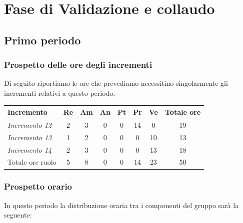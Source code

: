{{{{{{{{{{{{{{{{{\section{Fase di Validazione e collaudo}\label{PreventivoFaseDiProgettazionediValidazioneECollaudo}

\subsection{Primo periodo}\label{PreventivoFaseDiProgettazionediValidazioneECollaudoPrimoPeriodo}
\subsubsection{Prospetto delle ore degli incrementi}\label{PreventivoFaseDiProgettazionediValidazioneECollaudoPrimoPeriodoIncrementi}
Di seguito riportiamo le ore che prevediamo necessitino singolarmente gli incrementi relativi a questo periodo.
\quad
\def\tabularxcolumn#1{m{#1}}
{
	
	\begin{center}
		\renewcommand{\arraystretch}{1.4}
		\begin{tabularx}{\textwidth}{|X|c|c|c|c|c|c|c|}
			\hline
			\rowcolor{airforceblue}
			\textbf{Incremento} & \textbf{Re} & \textbf{Am} & \textbf{An} & \textbf{Pt} & \textbf{Pr} & \textbf{Ve} & \textbf{Totale ore}\\
			\hline
			\textit{Incremento 12} & 2 & 3 & 0 & 0 & 14 & 0 & 19\\
			\hline
			\textit{Incremento 13} & 1 & 2 & 0 & 0 & 0 & 10 & 13\\
			\hline
			\textit{Incremento 14} & 2 & 3 & 0 & 0 & 0 & 13 & 18\\			
			\hline
			Totale ore ruolo & 5 & 8 & 0 & 0 & 14 & 23 & 50\\
			\hline
		\end{tabularx}
	\end{center}

\subsubsection{Prospetto orario}\label{PreventivoFaseDiProgettazionediValidazioneECollaudoPrimoPeriodoProspettoOrario}
In questo periodo la distribuzione oraria tra i componenti del gruppo sarà la seguente:

}}}}}}}}}}}}}}}}}}
